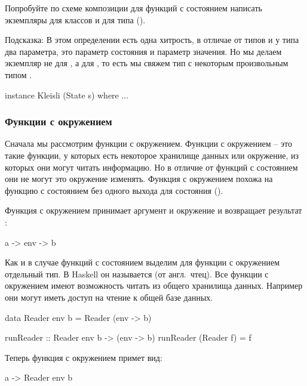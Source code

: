 Попробуйте по схеме композиции для функций с состоянием
написать экземпляры для классов  и 
для типа  (). 

Подсказка: В этом определении есть одна хитрость,
в отличае от типов  и \In{[a]} у типа
 два параметра, это параметр состояния 
и параметр значения. Но мы делаем экземпляр не
для , а для , то есть мы
свяжем тип с некоторым произвольным типом .

\begin{code}
instance Kleisli (State s) where
	...
\end{code}


\subsubsection{Функции с окружением}

Сначала мы рассмотрим функции с окружением. 
Функции с окружением -- это такие функции, у которых
есть некоторое хранилище данных или окружение, из которых
они могут читать информацию. Но в отличие от функций
с состоянием они не могут это окружение изменять. 
Функция с окружением похожа на функцию с состоянием без одного
выхода для состояния ().


Функция с окружением принимает аргумент  и окружение 
и возвращает результат :

\begin{code}
a -> env -> b
\end{code}

Как и в случае функций с состоянием выделим для функции
с окружением отдельный тип. В Haskell он называется 
(от англ.~чтец). Все функции с окружением имеют возможность
читать из общего хранилища данных. Например они могут иметь
доступ на чтение к общей базе данных. 

\begin{code}
data Reader env b = Reader (env -> b)

runReader :: Reader env b -> (env -> b)
runReader (Reader f) = f
\end{code}

Теперь функция с окружением примет вид:

\begin{code}
a -> Reader env b
\end{code}

